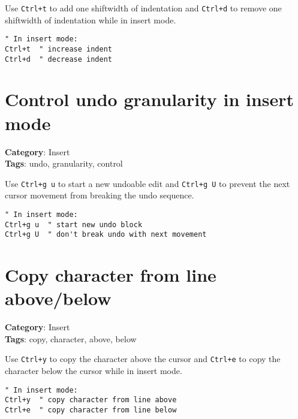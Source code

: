{{{{{{Use {\footnotesize \Verb§Ctrl+t§} to add one shiftwidth of indentation and {\footnotesize \Verb§Ctrl+d§} to remove one shiftwidth of indentation while in insert mode.

\begin{Exa*}{}
\begin{Verbatim}[fontsize=\footnotesize, breaklines, breakanywhere]
" In insert mode:
Ctrl+t  " increase indent
Ctrl+d  " decrease indent
\end{Verbatim}
\end{Exa*}

\section{Control undo granularity in insert mode}

\textbf{Category}: Insert\\ \textbf{Tags}: undo, granularity, control
\vspace{0.5cm}

Use {\footnotesize \Verb§Ctrl+g u§} to start a new undoable edit and {\footnotesize \Verb§Ctrl+g U§} to prevent the next cursor movement from breaking the undo sequence.

\begin{Exa*}{}
\begin{Verbatim}[fontsize=\footnotesize, breaklines, breakanywhere]
" In insert mode:
Ctrl+g u  " start new undo block
Ctrl+g U  " don't break undo with next movement
\end{Verbatim}
\end{Exa*}

\section{Copy character from line above/below}

\textbf{Category}: Insert\\ \textbf{Tags}: copy, character, above, below
\vspace{0.5cm}

Use {\footnotesize \Verb§Ctrl+y§} to copy the character above the cursor and {\footnotesize \Verb§Ctrl+e§} to copy the character below the cursor while in insert mode.

\begin{Exa*}{}
\begin{Verbatim}[fontsize=\footnotesize, breaklines, breakanywhere]
" In insert mode:
Ctrl+y  " copy character from line above
Ctrl+e  " copy character from line below
\end{Verbatim}
\end{Exa*}

}}}}}}
